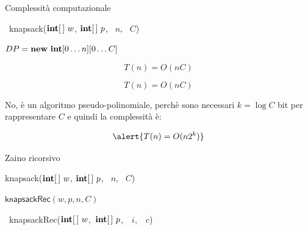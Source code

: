 \begin{frame}[fragile]{Complessità computazionale}


\begin{overprint}
\begingroup
\footnotesize
\begin{Procedure}
\caption[A]{\INTEGER\ \textsf{knapsack}($\INTEGER[\,]\ w$, $\INTEGER[\,]\ p$, \INTEGER\ $n$, \INTEGER\ $C$)}

$DP = \NEW\ \INTEGER[0 \ldots n][0 \ldots C]$\;
\;
\end{Procedure}
\endgroup
{}
\[ 
  T(n) = O(nC)
\]


\[ 
  T(n) = O(nC)
\]


\medskip
No, è un algoritmo \alert{pseudo-polinomiale}, perchè sono necessari \alert{$k = \log C$} bit
per rappresentare $C$ e quindi la complessità è:

\[
  \alert{T(n) = O(n 2^k) }
\]
\end{overprint}

\end{frame}


\begin{frame}{Zaino ricorsivo}

\vspace{-12pt}
\begin{Procedure}
\caption[A]{\textsf{knapsack}($\INTEGER[\,]\ w$, $\INTEGER[\,]\ p$, \INTEGER\ $n$, \INTEGER\ $C$)}
\Return $\textsf{knapsackRec}(w, p, n, C)$
\end{Procedure}

\vspace{-15pt}
\begin{Procedure}
\caption[A]{\INTEGER\ \textsf{knapsackRec}($\INTARRAY\ w$,\ $\INTARRAY\ p$,\  \INTEGER\ $i$,\ \INTEGER\ $c$)}

\end{Procedure}

\vspace{-6pt}

\end{frame}


